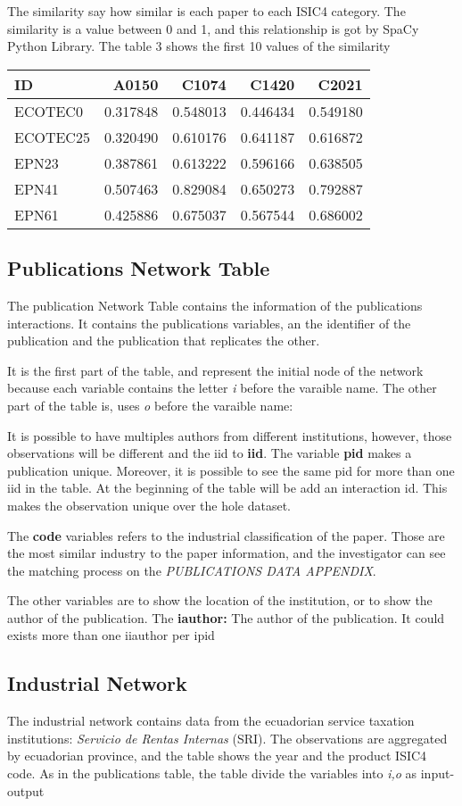 \documentclass[12pt]{article}
\begin{document}
The similarity say how similar is each paper
to each ISIC4 category. The similarity is a
value between 0 and 1, and this relationship
is got by SpaCy Python Library. The table 3
shows the first 10 values of the similarity

\begin{tabular}{lrrrr}
\toprule
ID & A0150 & C1074 & C1420 & C2021 \\
\midrule
ECOTEC0 & 0.317848 & 0.548013 & 0.446434 & 0.549180 \\
ECOTEC25 & 0.320490 & 0.610176 & 0.641187 & 0.616872 \\
EPN23 & 0.387861 & 0.613222 & 0.596166 & 0.638505 \\
EPN41 & 0.507463 & 0.829084 & 0.650273 & 0.792887 \\
EPN61 & 0.425886 & 0.675037 & 0.567544 & 0.686002 \\
\bottomrule
\end{tabular}

\subsection*{Publications Network Table}

The publication Network Table contains the information of
the publications interactions. It contains the publications
variables, an the identifier of the publication and 
the publication that replicates the other. 

It is the first part of the table, and represent the initial
node of the network because each variable contains the 
letter \textit{i} before the varaible name. The other part of
the table is, uses \textit{o} before the varaible name:

It is possible to have multiples authors from different
institutions, however, those observations will be different
and the iid to \textbf{iid}. The variable \textbf{pid} makes
a publication unique. Moreover, it is possible to see the
same pid for more than one iid in the table. At the
beginning of the table will be add an interaction id.
This makes the observation unique over the hole dataset.

The \textbf{code} variables refers to the industrial
classification of the paper. Those are the most similar
industry to the paper information, and the investigator 
can see the matching process on the \textit{PUBLICATIONS
DATA APPENDIX}.

The other variables are to show the location of the
institution, or to show the author of the publication. The
\textbf{iauthor:} The author of the publication. It could 
exists more than one iiauthor per ipid

\subsection*{Industrial Network}

The industrial network contains data from the ecuadorian 
service taxation institutions:
\textit{Servicio de Rentas Internas} (SRI). The observations
are aggregated by ecuadorian province, and the table shows
the year and the product ISIC4 code. As in the publications
table, the table divide the variables into \textit{i,o} as
input-output
\end{document}
